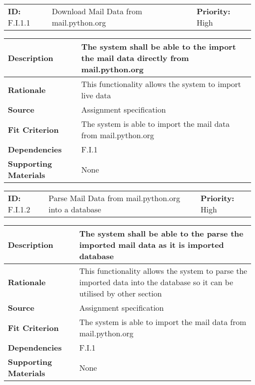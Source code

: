 \begin{table}[H]
    \begin{tabularx}{\textwidth}{| l | X | l |}
        \hline
        \textbf{ID:} F.I.1.1 & Download Mail Data from mail.python.org & \textbf{Priority:} High \\
    \end{tabularx}
    \begin{tabularx}{\textwidth}{| l | X |}
        \hline
        \textbf{Description} & The system shall be able to the import the mail data directly from mail.python.org \\ \hline
        \textbf{Rationale} & This functionality allows the system to import live data\\ \hline
        \textbf{Source} & Assignment specification\\ \hline
        \textbf{Fit Criterion} & The system is able to import the mail data from mail.python.org\\ \hline
        \textbf{Dependencies} & F.I.1 \\ \hline
        \textbf{Supporting Materials} & None \\ \hline
    \end{tabularx}
\end{table}

\begin{table}[H]
    \begin{tabularx}{\textwidth}{| l | X | l |}
        \hline
        \textbf{ID:} F.I.1.2 & Parse Mail Data from mail.python.org into a database & \textbf{Priority:} High \\
    \end{tabularx}
    \begin{tabularx}{\textwidth}{| l | X |}
        \hline
        \textbf{Description} & The system shall be able to the parse the imported mail data as it is imported database\\ \hline
        \textbf{Rationale} & This functionality allows the system to parse the imported data into the database so it can be utilised by other section\\ \hline
        \textbf{Source} & Assignment specification\\ \hline
        \textbf{Fit Criterion} & The system is able to import the mail data from mail.python.org\\ \hline
        \textbf{Dependencies} & F.I.1 \\ \hline
        \textbf{Supporting Materials} & None \\ \hline
    \end{tabularx}
\end{table}

